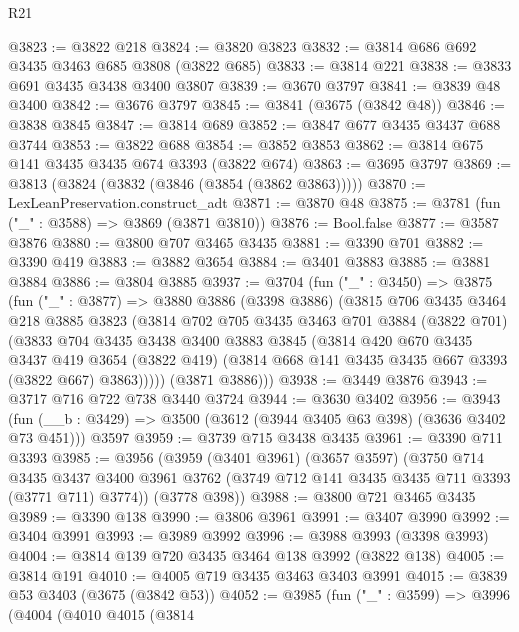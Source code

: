 \begin{lexlean}{R21}
\begin{coremodule}
@3823 := @3822 @218
@3824 := @3820 @3823
@3832 := @3814 @686 @692 @3435 @3463 @685 @3808 (@3822 @685)
@3833 := @3814 @221
@3838 := @3833 @691 @3435 @3438 @3400 @3807
@3839 := @3670 @3797
@3841 := @3839 @48 @3400
@3842 := @3676 @3797
@3845 := @3841 (@3675 (@3842 @48))
@3846 := @3838 @3845
@3847 := @3814 @689
@3852 := @3847 @677 @3435 @3437 @688 @3744
@3853 := @3822 @688
@3854 := @3852 @3853
@3862 := @3814 @675 @141 @3435 @3435 @674 @3393 (@3822 @674)
@3863 := @3695 @3797
@3869 := @3813 (@3824 (@3832 (@3846 (@3854 (@3862 @3863)))))
@3870 := LexLeanPreservation.construct_adt
@3871 := @3870 @48
@3875 := @3781 (fun ("_" : @3588) => @3869 (@3871 @3810))
@3876 := Bool.false
@3877 := @3587 @3876
@3880 := @3800 @707 @3465 @3435
@3881 := @3390 @701
@3882 := @3390 @419
@3883 := @3882 @3654
@3884 := @3401 @3883
@3885 := @3881 @3884
@3886 := @3804 @3885
@3937 := @3704
    (fun ("_" : @3450) =>
    @3875
      (fun ("_" : @3877) =>
      @3880
        @3886
        (@3398 @3886)
        (@3815
          @706
          @3435
          @3464
          @218
          @3885
          @3823
          (@3814
            @702
            @705
            @3435
            @3463
            @701
            @3884
            (@3822 @701)
            (@3833
              @704
              @3435
              @3438
              @3400
              @3883
              @3845
              (@3814
                @420
                @670
                @3435
                @3437
                @419
                @3654
                (@3822 @419)
                (@3814 @668 @141 @3435 @3435 @667 @3393 (@3822 @667) @3863)))))
        (@3871 @3886)))
@3938 := @3449 @3876
@3943 := @3717 @716 @722 @738 @3440 @3724
@3944 := @3630 @3402
@3956 := @3943
    (fun (__b : @3429) => @3500 (@3612 (@3944 @3405 @63 @398) (@3636 @3402 @73 @451)))
    @3597
@3959 := @3739 @715 @3438 @3435
@3961 := @3390 @711 @3393
@3985 := @3956
    (@3959
      (@3401 @3961)
      (@3657 @3597)
      (@3750
        @714
        @3435
        @3437
        @3400
        @3961
        @3762
        (@3749 @712 @141 @3435 @3435 @711 @3393 (@3771 @711) @3774))
      (@3778 @398))
@3988 := @3800 @721 @3465 @3435
@3989 := @3390 @138
@3990 := @3806 @3961
@3991 := @3407 @3990
@3992 := @3404 @3991
@3993 := @3989 @3992
@3996 := @3988 @3993 (@3398 @3993)
@4004 := @3814 @139 @720 @3435 @3464 @138 @3992 (@3822 @138)
@4005 := @3814 @191
@4010 := @4005 @719 @3435 @3463 @3403 @3991
@4015 := @3839 @53 @3403 (@3675 (@3842 @53))
@4052 := @3985
    (fun ("_" : @3599) =>
    @3996
      (@4004
        (@4010
          @4015
          (@3814

\end{coremodule}
\end{lexlean}

